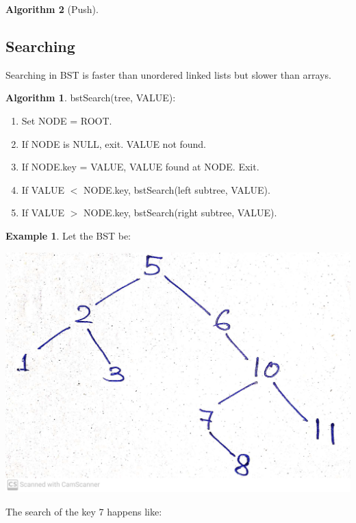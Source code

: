 \documentclass[10pt, a4paper]{extarticle}
\theoremstyle{definition}
\newtheorem{alg}{Algorithm}
\newtheorem{eg}{Example}
\begin{document}
\begin{alg}[Push]
	\subsection{Searching}
	Searching in BST is faster than unordered linked lists but slower than arrays.\\
	\begin{alg}
	bstSearch(tree, VALUE):
	\begin{enumerate}
		\item Set NODE = ROOT.
		\item If NODE is NULL, exit. VALUE not found.
		\item If NODE.key = VALUE, VALUE found at NODE. Exit.
		\item If VALUE $<$ NODE.key, bstSearch(left subtree, VALUE).
		\item If VALUE $>$ NODE.key, bstSearch(right subtree, VALUE).
\end{enumerate}
	\end{alg}
	\begin{eg}
		Let the BST be:
		\begin{center}
			\includegraphics[scale=0.07]{bst1.jpg}\\
		\end{center}
		The search of the key 7 happens like:
		\begin{center}

\end{center}
\end{eg}
\end{alg}
\end{document}
